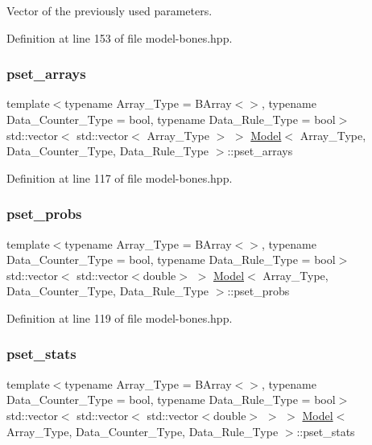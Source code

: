 Vector of the previously used parameters. 



Definition at line 153 of file model-\/bones.\+hpp.

\mbox{\label{class_model_a875ac0dbc320797c843b6724b7736f77}} 
\subsubsection{\texorpdfstring{pset\+\_\+arrays}{pset\_arrays}}
{\footnotesize\ttfamily template$<$typename Array\+\_\+\+Type = B\+Array$<$$>$, typename Data\+\_\+\+Counter\+\_\+\+Type = bool, typename Data\+\_\+\+Rule\+\_\+\+Type = bool$>$ \\
std\+::vector$<$ std\+::vector$<$ Array\+\_\+\+Type $>$ $>$ \hyperlink{class_model}{Model}$<$ Array\+\_\+\+Type, Data\+\_\+\+Counter\+\_\+\+Type, Data\+\_\+\+Rule\+\_\+\+Type $>$\+::pset\+\_\+arrays}



Definition at line 117 of file model-\/bones.\+hpp.

\mbox{\label{class_model_a5dea24375889e55064f052fd8e8c4fe2}} 
\subsubsection{\texorpdfstring{pset\+\_\+probs}{pset\_probs}}
{\footnotesize\ttfamily template$<$typename Array\+\_\+\+Type = B\+Array$<$$>$, typename Data\+\_\+\+Counter\+\_\+\+Type = bool, typename Data\+\_\+\+Rule\+\_\+\+Type = bool$>$ \\
std\+::vector$<$ std\+::vector$<$double$>$ $>$ \hyperlink{class_model}{Model}$<$ Array\+\_\+\+Type, Data\+\_\+\+Counter\+\_\+\+Type, Data\+\_\+\+Rule\+\_\+\+Type $>$\+::pset\+\_\+probs}



Definition at line 119 of file model-\/bones.\+hpp.

\mbox{\label{class_model_a89fff457ecccc91a624e20cafbf3e765}} 
\subsubsection{\texorpdfstring{pset\+\_\+stats}{pset\_stats}}
{\footnotesize\ttfamily template$<$typename Array\+\_\+\+Type = B\+Array$<$$>$, typename Data\+\_\+\+Counter\+\_\+\+Type = bool, typename Data\+\_\+\+Rule\+\_\+\+Type = bool$>$ \\
std\+::vector$<$ std\+::vector$<$ std\+::vector$<$double$>$ $>$ $>$ \hyperlink{class_model}{Model}$<$ Array\+\_\+\+Type, Data\+\_\+\+Counter\+\_\+\+Type, Data\+\_\+\+Rule\+\_\+\+Type $>$\+::pset\+\_\+stats}



